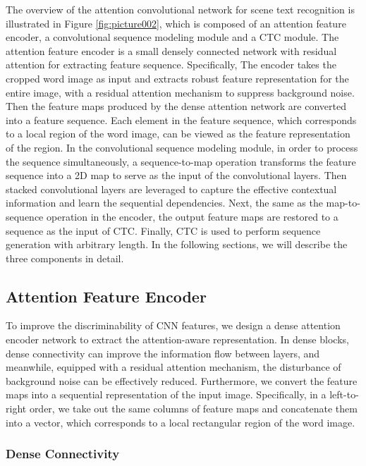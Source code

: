 \documentclass[letterpaper]{article} %
\begin{document}
The overview of the attention convolutional network for scene text recognition is illustrated in Figure \ref{fig:picture002}, which is composed of an attention feature encoder, a convolutional sequence modeling module and a CTC module. The attention feature encoder is a small densely connected network with residual attention for extracting feature sequence. Specifically, The encoder takes the cropped word image as input and extracts robust feature representation for the entire image, with a residual attention mechanism to suppress background noise. Then the feature maps produced by the dense attention network are converted into a feature sequence. Each element in the feature sequence, which corresponds to a local region of the word image, can be viewed as the feature representation of the region. In the convolutional sequence modeling module, in order to process the sequence simultaneously, a sequence-to-map operation transforms the feature sequence into a 2D map to serve as the input of the convolutional layers. Then stacked convolutional layers are leveraged to capture the effective contextual information and learn the sequential dependencies. Next, the same as the map-to-sequence operation in the encoder, the output feature maps are restored to a sequence as the input of CTC. Finally, CTC is used to perform sequence generation with arbitrary length. In the following sections, we will describe the three components in detail.

\subsection{Attention Feature Encoder}

To improve the discriminability of CNN features, we design a dense attention encoder network to extract the attention-aware representation. In dense blocks, dense connectivity can improve the information flow between layers, and meanwhile, equipped with a residual attention mechanism, the disturbance of background noise can be effectively reduced. Furthermore, we convert the feature maps into a sequential representation of the input image. Specifically, in a left-to-right order, we take out the same columns of feature maps and concatenate them into a vector, which corresponds to a local rectangular region of the word image.

\subsubsection{Dense Connectivity}
\end{document}
